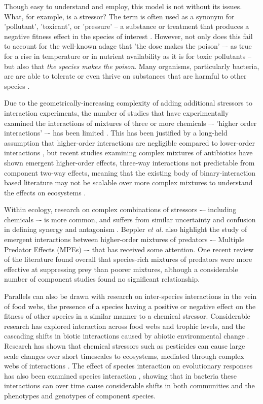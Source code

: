 \documentclass[final,1p,times]{elsarticle}
\begin{document}
Though easy to understand and employ, this model is not without its issues. What, for example, is a stressor? The term is often used as a synonym for 'pollutant', 'toxicant', or 'pressure' -- a substance or treatment that produces a negative fitness effect in the species of interest \cite{Piggott2015}. However, not only does this fail to account for the well-known adage that 'the dose makes the poison'\cite{OGParacelsus} –- as true for a rise in temperature or in nutrient availability as it is for toxic pollutants -- but also that \textit{the species makes the poison}. Many organisms, particularly bacteria, are are able to tolerate or even thrive on substances that are harmful to other species \cite{Malik2004,Gadd2009}. 

Due to the geometrically-increasing complexity of adding additional stressors to interaction experiments, the number of studies that have experimentally examined the interactions of mixtures of three or more chemicals –- 'higher order interactions' –- has been limited \cite{Beppler2016}. This has been justified by a long-held assumption that higher-order interactions are negligible compared to lower-order interactions \cite{Tekin2017a}, but recent studies examining complex mixtures of antibiotics have shown emergent higher-order effects,  three-way interactions not predictable from component two-way effects, meaning that the existing body of binary-interaction based literature may not be scalable over more complex mixtures to understand the effects on ecosystems \cite{Tekin2016, Zimmer2016, Tekin2017}.

Within ecology, research on complex combinations of stressors -– including chemicals –- is more common, and suffers from similar uncertainty and confusion in defining synergy and antagonism \cite{Cote2016}.  Beppler \textit{et al.} also highlight the study of emergent interactions between higher-order mixtures of predators -– Multiple Predator Effects (MPEs) –- that has received some attention. One recent review of the literature \cite{Griffin2013EffectsMeta-analysis} found overall that species-rich mixtures of predators were more effective at suppressing prey than poorer mixtures, although a considerable number of component studies found no significant relationship. 

Parallels can also be drawn with research on inter-species interactions in the vein of food webs, the presence of a species having a positive or negative effect on the fitness of other species in a similar manner to a chemical stressor. Considerable research has explored interaction across food webs and trophic levels, and the  cascading shifts in biotic interactions caused by abiotic environmental change \cite{Hooper2005,Parmesan2006,Chesson2000}. Research has shown that chemical stressors such as pesticides can cause large scale changes over short timescales to ecosystems, mediated through complex webs of interactions \cite{Thompson2016}. The effect of species interaction on evolutionary responses has also been examined species interaction \cite{Lawrence2012}, showing that in bacteria these interactions can over time cause considerable shifts in both communities and the phenotypes and genotypes of component species.
\end{document}
